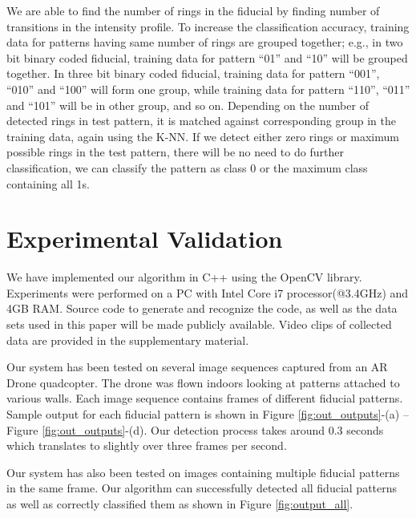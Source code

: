 \documentclass[runningheads]{llncs}
\begin{document}
We are able to find the number of rings in the fiducial by finding
number of transitions in the intensity profile. To increase the classification
accuracy, training data for patterns having same number of rings are grouped together; e.g., in two bit
binary coded fiducial, training data for pattern ``01'' and ``10'' will be
grouped together. In three bit binary coded fiducial, training data for pattern
``001'', ``010'' and ``100'' will form one group, while training data for
pattern ``110'', ``011'' and ``101'' will be in other group, and so on. 
Depending on the number of detected rings in test pattern, it is matched
against corresponding group in the training data, again using  the K-NN. 
If we detect either zero rings or maximum possible
rings in the test pattern, there will be no need to do further classification, we
can classify the pattern as class 0 or the maximum class containing all 1s.

\section{Experimental Validation}

We have implemented our algorithm in C++ using the OpenCV library.
Experiments were performed on a PC with Intel Core i7 processor(@3.4GHz) and 4GB RAM.
Source code to generate and recognize the code, as well as the data sets used in
this paper will be made publicly available.  Video clips
of collected data are provided in the supplementary material.

Our system has been tested on several image sequences captured from an AR Drone
quadcopter.  The drone was flown indoors looking at patterns attached to
various walls. Each image sequence contains frames of different fiducial
patterns. Sample output for each fiducial pattern is shown in Figure
\ref{fig:out_outputs}-(a) -- Figure \ref{fig:out_outputs}-(d). Our detection
process takes around 0.3 seconds which translates to slightly over three frames per second.

Our system has also been tested on images containing multiple fiducial patterns
in the same frame. Our algorithm can successfully detected all fiducial patterns as
well as correctly classified them as shown in Figure \ref{fig:output_all}.
\end{document}
